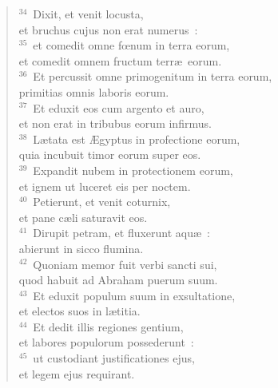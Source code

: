 \begin{verse}
${}^{34}$~Dixit, et venit locusta,\\ et bruchus cujus non erat numerus~:\\
${}^{35}$~et comedit omne fœnum in terra eorum,\\ et comedit omnem fructum terr\ae\ eorum.\\
${}^{36}$~Et percussit omne primogenitum in terra eorum,\\ primitias omnis laboris eorum.\\
${}^{37}$~Et eduxit eos cum argento et auro,\\ et non erat in tribubus eorum infirmus.\\
${}^{38}$~L\ae tata est \AE gyptus in profectione eorum,\\ quia incubuit timor eorum super eos.\\
${}^{39}$~Expandit nubem in protectionem eorum,\\ et ignem ut luceret eis per noctem.\\
${}^{40}$~Petierunt, et venit coturnix,\\ et pane c\ae li saturavit eos.\\
${}^{41}$~Dirupit petram, et fluxerunt aqu\ae~:\\ abierunt in sicco flumina.\\
${}^{42}$~Quoniam memor fuit verbi sancti sui,\\ quod habuit ad Abraham puerum suum.\\
${}^{43}$~Et eduxit populum suum in exsultatione,\\ et electos suos in l\ae titia.\\
${}^{44}$~Et dedit illis regiones gentium,\\ et labores populorum possederunt~:\\
${}^{45}$~ut custodiant justificationes ejus,\\ et legem ejus requirant.\end{verse}




